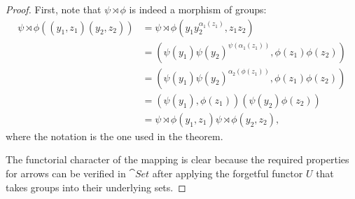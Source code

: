 \begin{proof}
    First, note that $\psi\rtimes\phi$ is indeed a morphism of groups:
    \begin{align*}
        \psi\rtimes\phi((y_1,z_1)(y_2,z_2))
            &= \psi\rtimes\phi(y_1y_2^{\alpha_1(z_1)},z_1z_2)\\
            &= (\psi(y_1)\psi(y_2)^{\psi(\alpha_1(z_1))},\phi(z_1)\phi(z_2))\\
            &= (\psi(y_1)\psi(y_2)^{\alpha_2(\phi(z_1))},\phi(z_1)\phi(z_2))\\
            &= (\psi(y_1),\phi(z_1))(\psi(y_2)\phi(z_2))\\
            &=  \psi\rtimes\phi(y_1,z_1)\psi\rtimes\phi(y_2,z_2),
    \end{align*}
    where the notation is the one used in the theorem.

    The functorial character of the mapping is clear because the required properties for arrows can be verified in $\cat{Set}$ after applying the forgetful functor $U$ that takes groups into their underlying sets.


\end{proof}
